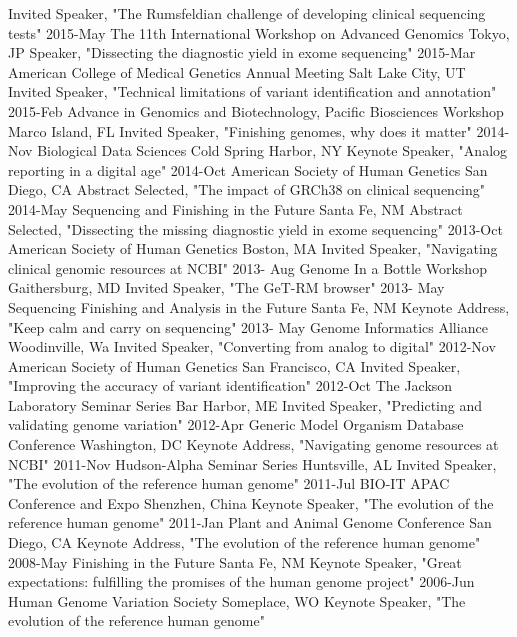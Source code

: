\documentclass[]{dmc-cv} %
\begin{document}
\begin{entrylist}
{Invited Speaker, "The Rumsfeldian challenge of developing clinical sequencing tests"}
\entry
{2015-May}
{The 11th International Workshop on Advanced Genomics}
{Tokyo, JP}
{Speaker, "Dissecting the diagnostic yield in exome sequencing"}
\entry
{2015-Mar}
{American College of Medical Genetics Annual Meeting}
{Salt Lake City, UT}
{Invited Speaker, "Technical limitations of variant identification and annotation"}
\entry
{2015-Feb}
{Advance in Genomics and Biotechnology, Pacific Biosciences Workshop}
{Marco Island, FL}
{Invited Speaker, "Finishing genomes, why does it matter"}
\entry
{2014-Nov}
{Biological Data Sciences}
{Cold Spring Harbor, NY}
{Keynote Speaker, "Analog reporting in a digital age"}
\entry
{2014-Oct}
{American Society of Human Genetics}
{San Diego, CA}
{Abstract Selected, "The impact of GRCh38 on clinical sequencing"}
\entry
{2014-May}
{Sequencing and Finishing in the Future}
{Santa Fe, NM}
{Abstract Selected, "Dissecting the missing diagnostic yield in exome sequencing"}
\entry
{2013-Oct}
{American Society of Human Genetics}
{Boston, MA}
{Invited Speaker, "Navigating clinical genomic resources at NCBI"}
\entry
{2013- Aug}
{Genome In a Bottle Workshop}
{Gaithersburg, MD}
{Invited Speaker, "The GeT-RM browser"}
\entry
{2013- May}
{Sequencing Finishing and Analysis in the Future}
{Santa Fe, NM}
{Keynote Address, "Keep calm and carry on sequencing"}
\entry
{2013- May}
{Genome Informatics Alliance}
{Woodinville, Wa}
{Invited Speaker, "Converting from analog to digital"}
\entry
{2012-Nov}
{American Society of Human Genetics}
{San Francisco, CA}
{Invited Speaker, "Improving the accuracy of variant identification"}
\entry
{2012-Oct}
{The Jackson Laboratory Seminar Series}
{Bar Harbor, ME}
{Invited Speaker, "Predicting and validating genome variation"}
\entry
{2012-Apr}
{Generic Model Organism Database Conference}
{Washington, DC}
{Keynote Address, "Navigating genome resources at NCBI"}
\entry
{2011-Nov}
{Hudson-Alpha Seminar Series}
{Huntsville, AL}
{Invited Speaker, "The evolution of the reference human genome"}
\entry
{2011-Jul}
{BIO-IT APAC Conference and Expo}
{Shenzhen, China}
{Keynote Speaker, "The evolution of the reference human genome"}
\entry
{2011-Jan}
{Plant and Animal Genome Conference}
{San Diego, CA}
{Keynote Address, "The evolution of the reference human genome"}
\entry
{2008-May}
{Finishing in the Future}
{Santa Fe, NM}
{Keynote Speaker, "Great expectations: fulfilling the promises of the human genome project"}
\entry
{2006-Jun}
{Human Genome Variation Society}
{Someplace, WO}
{Keynote Speaker, "The evolution of the reference human genome"}
\end{entrylist}
\end{document}
